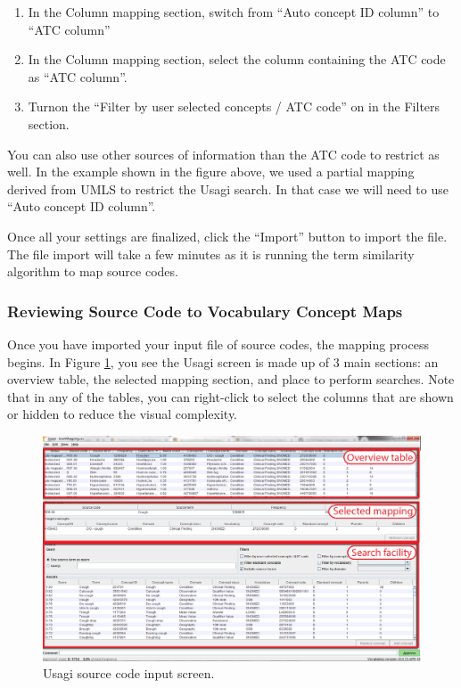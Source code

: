 \documentclass[11pt]{book}
\providecommand{\tightlist}{%
  \setlength{\itemsep}{0pt}\setlength{\parskip}{0pt}}
\theoremstyle{definition}
\theoremstyle{definition}
\theoremstyle{definition}
\theoremstyle{remark}
\begin{document}
\begin{enumerate}
\def\labelenumi{\arabic{enumi}.}
\tightlist
\item
  In the Column mapping section, switch from ``Auto concept ID column'' to ``ATC column''
\item
  In the Column mapping section, select the column containing the ATC code as ``ATC column''.
\item
  Turnon the ``Filter by user selected concepts / ATC code'' on in the Filters section.
\end{enumerate}

You can also use other sources of information than the ATC code to restrict as well. In the example shown in the figure above, we used a partial mapping derived from UMLS to restrict the Usagi search. In that case we will need to use ``Auto concept ID column''.

Once all your settings are finalized, click the ``Import'' button to import the file. The file import will take a few minutes as it is running the term similarity algorithm to map source codes.

\hypertarget{reviewing-source-code-to-vocabulary-concept-maps}{%
\subsubsection*{Reviewing Source Code to Vocabulary Concept Maps}\label{reviewing-source-code-to-vocabulary-concept-maps}}

Once you have imported your input file of source codes, the mapping process begins. In Figure \ref{fig:usagiOverview}, you see the Usagi screen is made up of 3 main sections: an overview table, the selected mapping section, and place to perform searches. Note that in any of the tables, you can right-click to select the columns that are shown or hidden to reduce the visual complexity.

\begin{figure}
\includegraphics[width=1\linewidth]{images/ExtractTransformLoad/usagiOverview} \caption{Usagi source code input screen.}\label{fig:usagiOverview}
\end{figure}
\end{document}
